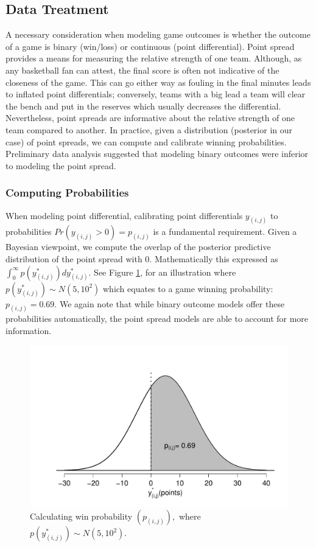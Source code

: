 \documentclass[letterpaper,12pt]{article}
\begin{document}
\subsection{Data Treatment}
A necessary consideration when modeling game outcomes is whether the outcome of a game is binary (win/loss) or continuous (point differential). Point spread provides a means for measuring the relative strength of one team. Although, as any basketball fan can attest, the final score is often not indicative of the closeness of the game. This can go either way as fouling in the final minutes leads to inflated point differentials; conversely, teams with a big lead a team will clear the bench and put in the reserves which usually decreases the differential. Nevertheless, point spreads are informative about the relative strength of one team compared to another. In practice, given a distribution (posterior in our case) of point spreads, we can compute and calibrate winning probabilities. Preliminary data analysis suggested that modeling binary outcomes were inferior to modeling the point spread. 
\subsubsection{Computing Probabilities}
When modeling point differential, calibrating point differentials $y_{(i,j)}$ to probabilities $Pr(y_{(i,j)}>0)=p_{(i,j)}$ is a fundamental requirement. Given a Bayesian viewpoint, we compute the overlap of the posterior predictive distribution of the point spread with 0. Mathematically this expressed as $\int_0^\infty p(y^*_{(i,j)})dy^*_{(i,j)}$. See Figure \ref{fig:winprob}, for an illustration where  $p(y^*_{(i,j)}) \sim N(5,10^2)$ which equates to a game winning probability: $p_{(i,j)}=0.69$.
We again note that while binary outcome models offer these probabilities automatically, the point spread models are able to account for more information. 
\begin{figure}[h!]
\centering
\includegraphics[width=.7\textwidth]{WinProb2.pdf}
\caption{Calculating win probability $(p_{(i,j)}),$ where $p(y^*_{(i,j)}) \sim N(5,10^2)$.}
\label{fig:winprob}
\end{figure} 
\end{document}

